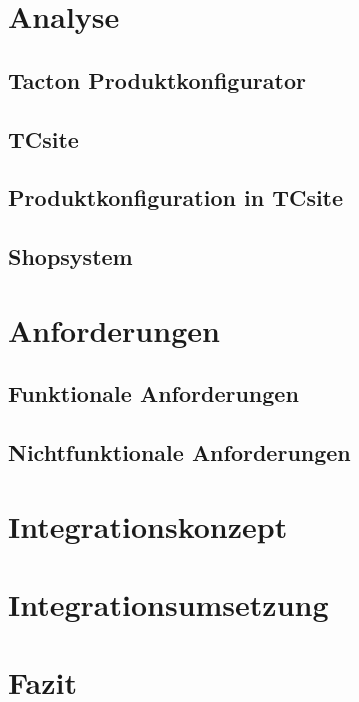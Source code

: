 \documentclass[12pt,a4paper,bibliography=totocnumbered,listof=totoc]{scrartcl}
\begin{document}
\pagebreak

\section{Analyse}

\subsection{Tacton Produktkonfigurator}

\subsection{TCsite}

\subsection{Produktkonfiguration in TCsite}

\subsection{Shopsystem}

\pagebreak

\section{Anforderungen}

\subsection{Funktionale Anforderungen}

\subsection{Nichtfunktionale Anforderungen}

\pagebreak

\section{Integrationskonzept}

\pagebreak

\section{Integrationsumsetzung}

\pagebreak

\section{Fazit}
\end{document}

